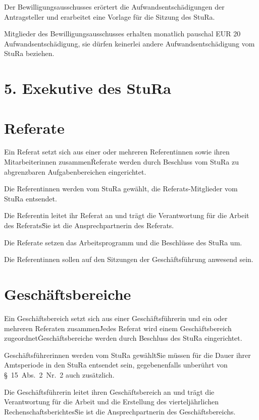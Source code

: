 \begin{multicols}{2}
\Abs \Satz Der Bewilligungsausschusses erörtert die Aufwandsentschädigungen der Antragsteller und erarbeitet eine Vorlage für die Sitzung des StuRa.

\Abs \Satz Mitglieder des Bewilligungsausschusses erhalten monatlich pauschal EUR 20 Aufwandsentschädigung, sie dürfen keinerlei andere Aufwandsentschädigung vom StuRa beziehen.

\setcounter{section}{24}

\section*{5. Exekutive des StuRa}



\section{Referate} %

\Abs \Satz Ein Referat setzt sich aus einer oder mehreren Referentinnen sowie ihren Mitarbeiterinnen zusammen\. Referate werden durch Beschluss vom StuRa zu abgrenzbaren Aufgabenbereichen eingerichtet.

\Abs \Satz Die Referentinnen werden vom StuRa gewählt, die Referats-Mitglieder vom StuRa entsendet.

\Abs \Satz Die Referentin leitet ihr Referat an und trägt die Verantwortung für die Arbeit des Referats\. Sie ist die Ansprechpartnerin des Referats.

\Abs \Satz Die Referate setzen das Arbeitsprogramm und die Beschlüsse des StuRa um.

\Abs \Satz Die Referentinnen sollen auf den Sitzungen der Geschäftsführung anwesend sein.



\section{Geschäftsbereiche}

\Abs \Satz Ein Geschäftsbereich setzt sich aus einer Geschäftsführerin und ein oder mehreren Referaten zusammen\. Jedes Referat wird einem Geschäftsbereich zugeordnet\. Geschäftsbereiche werden durch Beschluss des StuRa eingerichtet.

\Abs \Satz Geschäftsführerinnen werden vom StuRa gewählt\. Sie müssen für die Dauer ihrer Amtsperiode in den StuRa entsendet sein, gegebenenfalls unberührt von §~15~Abs.~2~Nr.~2 auch zusätzlich.

\Abs \Satz Die Geschäftsführerin leitet ihren Geschäftsbereich an und trägt die Verantwortung für die Arbeit und die Erstellung des vierteljährlichen Rechenschaftsberichtes\. Sie ist die Ansprechpartnerin des Geschäftsbereichs.




\end{multicols}
